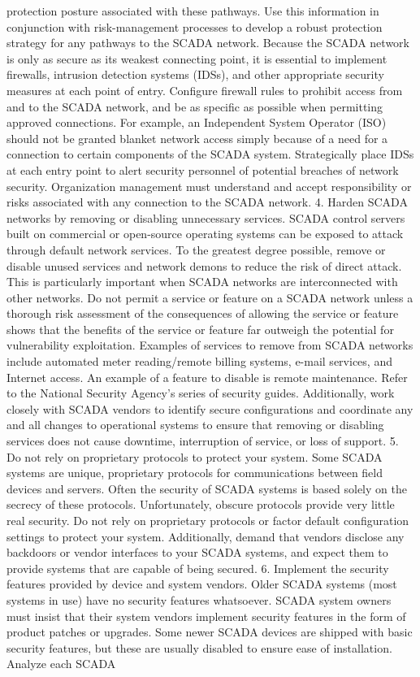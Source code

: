 \documentclass{article}
\begin{document}
protection posture associated with these pathways. Use this information
in conjunction with risk-management processes to develop a robust
protection strategy for any pathways to the SCADA network. Because the
SCADA network is only as secure as its weakest connecting point, it is
essential to implement firewalls, intrusion detection systems (IDSs),
and other appropriate security measures at each point of entry.
Configure firewall rules to prohibit access from and to the SCADA
network, and be as specific as possible when permitting approved
connections. For example, an Independent System Operator (ISO) should
not be granted blanket network access simply because of a need for a
connection to certain components of the SCADA system. Strategically
place IDSs at each entry point to alert security personnel of potential
breaches of network security. Organization management must understand
and accept responsibility or risks associated with any connection to the
SCADA network. 4. Harden SCADA networks by removing or disabling
unnecessary services. SCADA control servers built on commercial or
open-source operating systems can be exposed to attack through default
network services. To the greatest degree possible, remove or disable
unused services and network demons to reduce the risk of direct attack.
This is particularly important when SCADA networks are interconnected
with other networks. Do not permit a service or feature on a SCADA
network unless a thorough risk assessment of the consequences of
allowing the service or feature shows that the benefits of the service
or feature far outweigh the potential for vulnerability exploitation.
Examples of services to remove from SCADA networks include automated
meter reading/remote billing systems, e-mail services, and Internet
access. An example of a feature to disable is remote maintenance. Refer
to the National Security Agency's series of security guides.
Additionally, work closely with SCADA vendors to identify secure
configurations and coordinate any and all changes to operational systems
to ensure that removing or disabling services does not cause downtime,
interruption of service, or loss of support. 5. Do not rely on
proprietary protocols to protect your system. Some SCADA systems are
unique, proprietary protocols for communications between field devices
and servers. Often the security of SCADA systems is based solely on the
secrecy of these protocols. Unfortunately, obscure protocols provide
very little real security. Do not rely on proprietary protocols or
factor default configuration settings to protect your system.
Additionally, demand that vendors disclose any backdoors or vendor
interfaces to your SCADA systems, and expect them to provide systems
that are capable of being secured. 6. Implement the security features
provided by device and system vendors. Older SCADA systems (most systems
in use) have no security features whatsoever. SCADA system owners must
insist that their system vendors implement security features in the form
of product patches or upgrades. Some newer SCADA devices are shipped
with basic security features, but these are usually disabled to ensure
ease of installation. Analyze each SCADA
\end{document}
